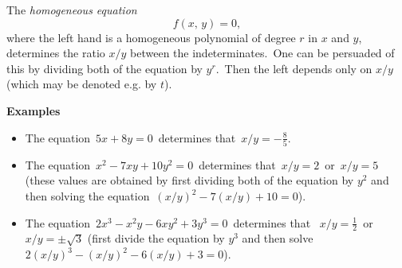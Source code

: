 \documentclass[12pt]{article}
\theoremstyle{definition}
\begin{document}
The {\em homogeneous equation}
   $$f(x,\,y) = 0,$$
where the left hand  is a homogeneous polynomial of degree $r$ in $x$ and $y$,\, determines the ratio $x/y$ between the indeterminates.\, One can be persuaded of this by dividing both  of the equation by $y^r$.\, Then the left  depends only on $x/y$ (which may be denoted e.g. by $t$).

\textbf{Examples} 
\begin{itemize}
 \item The equation\, $5x+8y = 0$\, determines that\, $x/y = -\frac{8}{5}$.
 \item The equation\, $x^2-7xy+10y^2 = 0$\, determines that\, $x/y = 2$\, or\, $x/y = 5$\, (these values are obtained by first dividing both  of the equation by $y^2$ and then solving the equation\, $(x/y)^2-7(x/y)+10 = 0$).
 \item The equation\, $2x^3-x^2y-6xy^2+3y^3 = 0$\, determines that
\, $x/y = \frac{1}{2}$\, or\, $x/y = \pm\sqrt{3}$ (first divide the equation by $y^3$ and then solve\, $2(x/y)^3-(x/y)^2-6(x/y)+3 = 0$).
\end{itemize}
\end{document}
